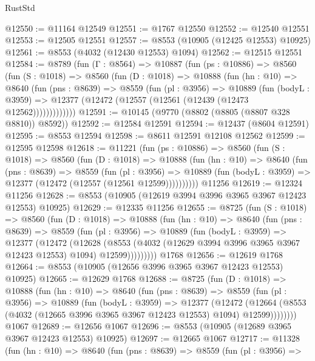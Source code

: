 \begin{lexlean}{RustStd}
\begin{coremodule}
@12550 := @11164 @12549
@12551 := @1767 @12550
@12552 := @12540 @12551
@12553 := @12505 @12551
@12557 := @8553 (@10905 (@12425 @12553) @10925)
@12561 := @8553 (@4032 (@12430 @12553) @1094)
@12562 := @12515 @12551
@12584 := @8789
    (fun (Γ : @8564) =>
    @10887
      (fun (ps : @10886) =>
      @8560
        (fun (S : @1018) =>
        @8560
          (fun (D : @1018) =>
          @10888
            (fun (hn : @10) =>
            @8640
              (fun (pns : @8639) =>
              @8559
                (fun (pl : @3956) =>
                @10889
                  (fun (bodyL : @3959) =>
                  @12377 (@12472 (@12557 (@12561 (@12439 (@12473 @12562)))))))))))))
@12591 := @10145 (@9770 (@8802 (@8805 (@8807 @328 @8810)) @8592))
@12592 := @12584 @12591
@12594 := @12437 (@8604 @12591)
@12595 := @8553 @12594
@12598 := @8611 @12591 @12108 @12562
@12599 := @12595 @12598
@12618 := @11221
    (fun (ps : @10886) =>
    @8560
      (fun (S : @1018) =>
      @8560
        (fun (D : @1018) =>
        @10888
          (fun (hn : @10) =>
          @8640
            (fun (pns : @8639) =>
            @8559
              (fun (pl : @3956) =>
              @10889 (fun (bodyL : @3959) => @12377 (@12472 (@12557 (@12561 @12599))))))))))
    @11256
@12619 := @12324 @11256
@12628 := @8553 (@10905 (@12619 @3994 @3996 @3965 @3967 @12423 @12553) @10925)
@12629 := @12335 @11256
@12655 := @8725
    (fun (S : @1018) =>
    @8560
      (fun (D : @1018) =>
      @10888
        (fun (hn : @10) =>
        @8640
          (fun (pns : @8639) =>
          @8559
            (fun (pl : @3956) =>
            @10889
              (fun (bodyL : @3959) =>
              @12377
                (@12472
                  (@12628
                    (@8553
                      (@4032 (@12629 @3994 @3996 @3965 @3967 @12423 @12553) @1094)
                      @12599)))))))))
    @1768
@12656 := @12619 @1768
@12664 := @8553 (@10905 (@12656 @3996 @3965 @3967 @12423 @12553) @10925)
@12665 := @12629 @1768
@12688 := @8725
    (fun (D : @1018) =>
    @10888
      (fun (hn : @10) =>
      @8640
        (fun (pns : @8639) =>
        @8559
          (fun (pl : @3956) =>
          @10889
            (fun (bodyL : @3959) =>
            @12377
              (@12472
                (@12664 (@8553 (@4032 (@12665 @3996 @3965 @3967 @12423 @12553) @1094) @12599))))))))
    @1067
@12689 := @12656 @1067
@12696 := @8553 (@10905 (@12689 @3965 @3967 @12423 @12553) @10925)
@12697 := @12665 @1067
@12717 := @11328
    (fun (hn : @10) =>
    @8640
      (fun (pns : @8639) =>
      @8559
        (fun (pl : @3956) =>

\end{coremodule}
\end{lexlean}
